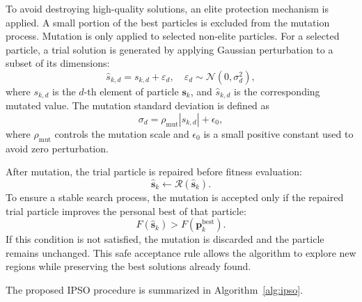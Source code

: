 \documentclass[conference]{IEEEtran}
\begin{document}
To avoid destroying high-quality solutions, an elite protection mechanism is applied. A small portion of the best particles is excluded from the mutation process. Mutation is only applied to selected non-elite particles. For a selected particle, a trial solution is generated by applying Gaussian perturbation to a subset of its dimensions:
\begin{equation}
\hat{s}_{k,d}
=
s_{k,d}
+
\varepsilon_d,
\quad
\varepsilon_d
\sim
\mathcal{N}
\left(
0,\sigma_d^2
\right),
\label{eq:gaussian_mutation}
\end{equation}
where $s_{k,d}$ is the $d$-th element of particle $\mathbf{s}_k$, and $\hat{s}_{k,d}$ is the corresponding mutated value. The mutation standard deviation is defined as
\begin{equation}
\sigma_d
=
\rho_{\mathrm{mut}}
\left|
s_{k,d}
\right|
+
\epsilon_0,
\label{eq:mutation_sigma}
\end{equation}
where $\rho_{\mathrm{mut}}$ controls the mutation scale and $\epsilon_0$ is a small positive constant used to avoid zero perturbation.

After mutation, the trial particle is repaired before fitness evaluation:
\begin{equation}
\hat{\mathbf{s}}_k
\leftarrow
\mathcal{R}
\left(
\hat{\mathbf{s}}_k
\right).
\end{equation}
To ensure a stable search process, the mutation is accepted only if the repaired trial particle improves the personal best of that particle:
\begin{equation}
F
\left(
\hat{\mathbf{s}}_k
\right)
>
F
\left(
\mathbf{p}_k^{\mathrm{best}}
\right).
\label{eq:safe_acceptance}
\end{equation}
If this condition is not satisfied, the mutation is discarded and the particle remains unchanged. This safe acceptance rule allows the algorithm to explore new regions while preserving the best solutions already found.

The proposed IPSO procedure is summarized in Algorithm~\ref{alg:ipso}.
\end{document}
